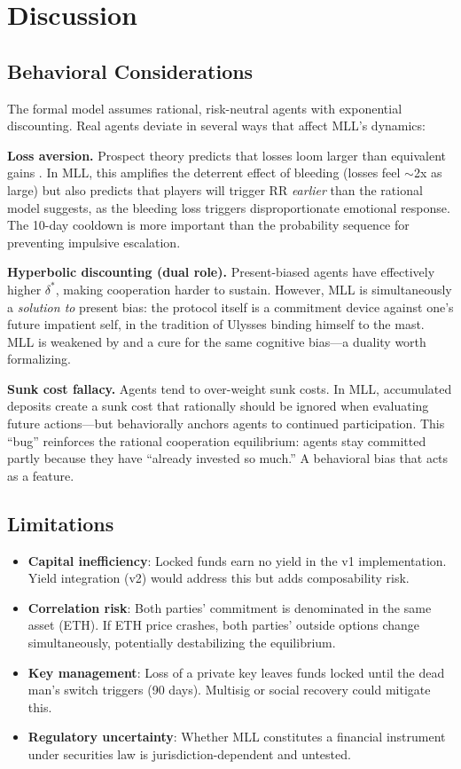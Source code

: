 \documentclass[12pt,a4paper]{article}
\begin{document}
\section{Discussion}
\label{sec:discussion}

\subsection{Behavioral Considerations}

The formal model assumes rational, risk-neutral agents with exponential discounting. Real agents deviate in several ways that affect MLL's dynamics:

\textbf{Loss aversion.} Prospect theory predicts that losses loom larger than equivalent gains \citep{kahneman1979}. In MLL, this amplifies the deterrent effect of bleeding (losses feel $\sim$2x as large) but also predicts that players will trigger RR \textit{earlier} than the rational model suggests, as the bleeding loss triggers disproportionate emotional response. The 10-day cooldown is more important than the probability sequence for preventing impulsive escalation.

\textbf{Hyperbolic discounting (dual role).} Present-biased agents have effectively higher $\delta^*$, making cooperation harder to sustain. However, MLL is simultaneously a \textit{solution to} present bias: the protocol itself is a commitment device against one's future impatient self, in the tradition of Ulysses binding himself to the mast. MLL is weakened by and a cure for the same cognitive bias---a duality worth formalizing.

\textbf{Sunk cost fallacy.} Agents tend to over-weight sunk costs. In MLL, accumulated deposits create a sunk cost that rationally should be ignored when evaluating future actions---but behaviorally anchors agents to continued participation. This ``bug'' reinforces the rational cooperation equilibrium: agents stay committed partly because they have ``already invested so much.'' A behavioral bias that acts as a feature.

\subsection{Limitations}

\begin{itemize}
\item \textbf{Capital inefficiency}: Locked funds earn no yield in the v1 implementation. Yield integration (v2) would address this but adds composability risk.
\item \textbf{Correlation risk}: Both parties' commitment is denominated in the same asset (ETH). If ETH price crashes, both parties' outside options change simultaneously, potentially destabilizing the equilibrium.
\item \textbf{Key management}: Loss of a private key leaves funds locked until the dead man's switch triggers (90 days). Multisig or social recovery could mitigate this.
\item \textbf{Regulatory uncertainty}: Whether MLL constitutes a financial instrument under securities law is jurisdiction-dependent and untested.
\end{itemize}
\end{document}
